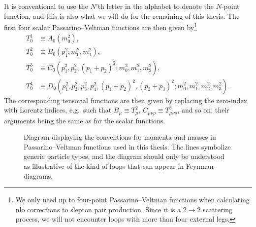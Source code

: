 It is conventional to use the $N$'th letter in the alphabet to denote the $N$-point function, and this is also what we will do for the remaining of this thesis.
The first four scalar Passarino--Veltman functions are then given by\footnote{We only need up to four-point Passarino--Veltman functions when calculating \gls{nlo} corrections to slepton pair production. Since it is a $2\to2$ scattering process, we will not encounter loops with more than four external legs.}
\begin{subequations}
\label{eq:pv_scalar_ABCD}
\begin{align}
    T_0^1 &\equiv A_0(m_0^2),
    \\
    T_0^2 &\equiv B_0(p_1^2; m_0^2, m_1^2),
    \\
    T_0^3 &\equiv C_0(p_1^2, p_2^2, (p_1+p_2)^2; m_0^2, m_1^2, m_2^2),
    \\
    T_0^4 &\equiv D_0(p_1^2, p_2^2, p_3^2, p_4^2, (p_1+p_2)^2, (p_2+p_3)^2; m_0^2, m_1^2, m_2^2, m_3^2).
    \label{eq:pv_scalar_D}
\end{align}
\end{subequations}
The corresponding tensorial functions are then given by replacing the zero-index with Lorentz indices, e.g.\ such that $B_\mu \equiv T_\mu^2$, $C_{\mu\nu\rho} \equiv T_{\mu\nu\rho}^3$, and so on; their arguments being the same as for the scalar functions.

\begin{figure}
    \centering
    \caption{Diagram displaying the conventions for momenta and masses in Passarino--Veltman functions used in this thesis. The lines symbolize generic particle types, and the diagram should only be understood as illustrative of the kind of loops that can appear in Feynman diagrams.}
    \label{fig:pv_loop}
\end{figure}


